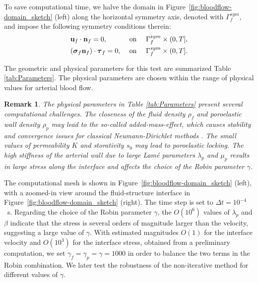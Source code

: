\documentclass[11pt]{article}
\def\u{{\bf u}}
\def\n{{\bf n}}
\def\btau{\boldsymbol{\tau}}
\def\bs{\boldsymbol{\sigma}}
\def\cl {\nonumber \\}
\newtheorem{remark}{Remark}[section]
\begin{document}
To save computational time, we halve the domain in 
Figure~\ref{fig:bloodflow-domain_sketch} (left) along the horizontal
symmetry axis, denoted with $\Gamma^{sym}_f$, and impose
the following symmetry conditions therein:
%
 \begin{align}
&\u_f \cdot \n_f=0,   &&\text{ on }\quad\Gamma^{sym}_f\times(0,T], \cl
& (\bs_f\n_f)\cdot \btau_f=0,  && \text{ on }\quad\Gamma^{sym}_f\times(0,T].
  \end{align}
  
The geometric and physical parameters for this test are summarized
Table \ref{tab:Parameters}. The physical parameters are chosen within the range of physical values for arterial blood flow.

\begin{remark}
The physical parameters in Table \ref{tab:Parameters} present several computational challenges. The closeness of the fluid density $\rho_f$ and poroelastic wall density $\rho_p$ may lead to the so-called added-mass-effect, which causes stability and convergence issues for classical Neumann-Dirichlet methods \cite{Causin-added-mass-effect,bqq2009}. The small values of permeability $K$ and storativity $s_0$ may lead to poroelastic locking. The high stiffness of the arterial wall due to large Lam\'e parameters $\lambda_p$ and $\mu_p$ results in large stress along the interface and affects the choice of the Robin parameter $\gamma$. 
\end{remark}

The computational mesh is shown in 
Figure~\ref{fig:bloodflow-domain_sketch} (left), with a zoomed-in view
around the fluid-structure interface in Figure~\ref{fig:bloodflow-domain_sketch} (right).
The time step is set to $\Delta t=10^{-4}$~s. Regarding the choice of the Robin parameter $\gamma$, the $O(10^6)$ values of $\lambda_p$ and $\beta$ indicate that the stress is several orders of magnitude larger than the velocity, suggesting a large value of $\gamma$. With estimated magnitudes $O(1)$ for the interface velocity and $O(10^3)$ for the interface stress, obtained from a preliminary computation, we set $\gamma_f = \gamma_p = \gamma = 1000$ in order to balance the two terms in the Robin combination. We later test the robustness of the non-iterative method for different values of $\gamma$.
\end{document}
